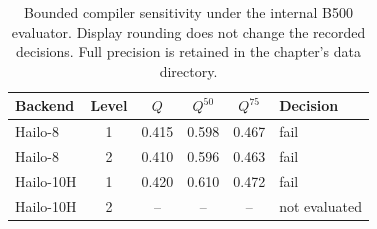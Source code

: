 \begin{table}[H]
\centering\small\TableSetup
\caption{Bounded compiler sensitivity under the internal B500 evaluator. Display rounding does not change the recorded decisions. Full precision is retained in the chapter's data directory.}
\label{tab:evaluation:yolov7_opt_sensitivity}
\begin{tabular}{@{}l c S[table-format=1.3] S[table-format=1.3] S[table-format=1.3] l@{}}
\toprule
Backend & Level & {$Q$} & {$Q^{50}$} & {$Q^{75}$} & Decision \\
\midrule
Hailo-8 & 1 & 0.415 & 0.598 & 0.467 & fail \\
Hailo-8 & 2 & 0.410 & 0.596 & 0.463 & fail \\
Hailo-10H & 1 & 0.420 & 0.610 & 0.472 & fail \\
Hailo-10H & 2 & {--} & {--} & {--} & not evaluated \\
\bottomrule
\end{tabular}
\end{table}
